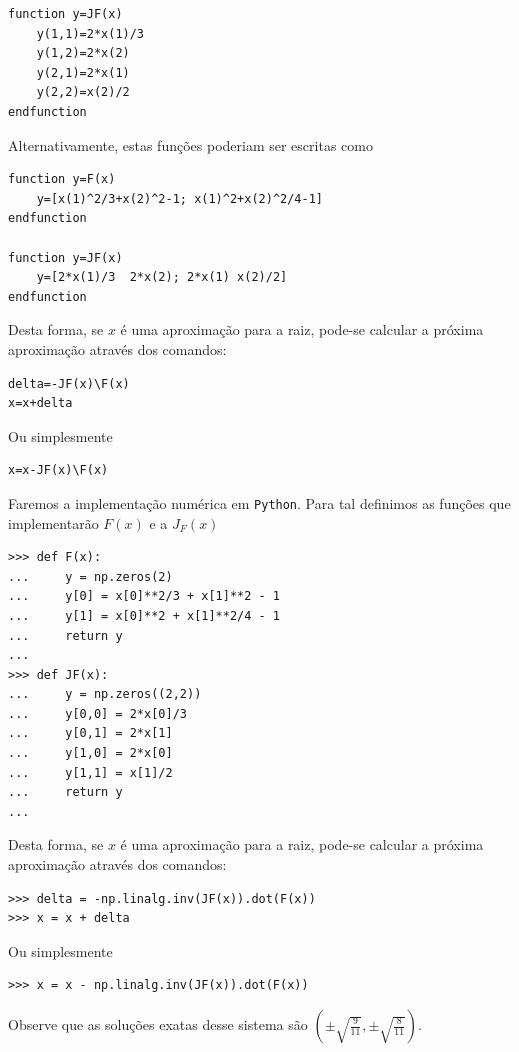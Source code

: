 \begin{ex}
\begin{verbatim}
function y=JF(x)
    y(1,1)=2*x(1)/3
    y(1,2)=2*x(2)
    y(2,1)=2*x(1)
    y(2,2)=x(2)/2
endfunction
\end{verbatim}
Alternativamente, estas funções poderiam ser escritas como
\begin{verbatim}
function y=F(x)
    y=[x(1)^2/3+x(2)^2-1; x(1)^2+x(2)^2/4-1]
endfunction

function y=JF(x)
    y=[2*x(1)/3  2*x(2); 2*x(1) x(2)/2]
endfunction
\end{verbatim}
Desta forma, se $x$ é uma aproximação para a raiz, pode-se calcular a próxima aproximação através dos comandos:
\begin{verbatim}
delta=-JF(x)\F(x)
x=x+delta
\end{verbatim}
Ou simplesmente
\begin{verbatim}
x=x-JF(x)\F(x)
\end{verbatim}
\fi
\ifispython
Faremos a implementação numérica em \verb+Python+. Para tal definimos as funções que implementarão $F(x)$ e a $J_F(x)$
\begin{verbatim}
>>> def F(x):
...     y = np.zeros(2)
...     y[0] = x[0]**2/3 + x[1]**2 - 1
...     y[1] = x[0]**2 + x[1]**2/4 - 1
...     return y
...
>>> def JF(x):
...     y = np.zeros((2,2))
...     y[0,0] = 2*x[0]/3
...     y[0,1] = 2*x[1]
...     y[1,0] = 2*x[0]
...     y[1,1] = x[1]/2
...     return y
...
\end{verbatim}
Desta forma, se $x$ é uma aproximação para a raiz, pode-se calcular a próxima aproximação através dos comandos:
\begin{verbatim}
>>> delta = -np.linalg.inv(JF(x)).dot(F(x))
>>> x = x + delta
\end{verbatim}
Ou simplesmente
\begin{verbatim}
>>> x = x - np.linalg.inv(JF(x)).dot(F(x))
\end{verbatim}
\fi
Observe que as soluções exatas desse sistema são $\left(\pm \sqrt{\frac{9}{11}},\pm \sqrt{\frac{8}{11}}\right)$.
\end{ex}


